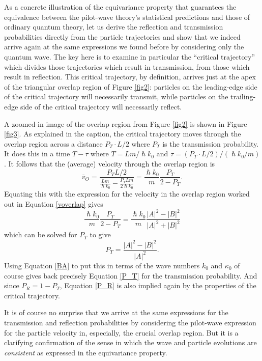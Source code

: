 \documentclass[aps,prc,onecolumn,letterpaper,floatfix,12pt]{revtex4}
\renewcommand{\hbar}{\hslash}
\begin{document}
As a concrete illustration of the equivariance property that guarantees
the equivalence between the pilot-wave theory's statistical
predictions and those of ordinary quantum theory, let us derive the
reflection and transmission probabilities directly from the particle
trajectories and show that we indeed arrive again at the same
expressions we found before by considering only the quantum wave.  The
key here is to examine in particular the ``critical trajectory'' which
divides those trajectories which result in transmission, from those
which result in reflection.  This critical trajectory, by definition,
arrives just at the apex of the triangular overlap region of Figure
\ref{fig2}:  particles on the leading-edge side of the critical
trajectory will necessarily transmit, while particles on the
trailing-edge side of the critical trajectory will necessarily
reflect.  



A zoomed-in image of the overlap region from Figure \ref{fig2} is
shown in Figure \ref{fig3}.   As explained in the caption, the
critical trajectory moves through the overlap region across a distance 
$P_T\cdot L / 2$ where $P_T$ is the transmission probability.  It does
this in a time $T - \tau$ where $T = L m / \hbar k_0 $ and $\tau = (P_T
\cdot L / 2)/(\hbar k_0 /m)$.  It follows that the (average) velocity
through the overlap region is
\begin{equation}
\bar{v}_O = \frac{ P_T L / 2}{\frac{Lm}{\hbar k_0} - \frac{P_T L m}{2 \hbar
    k_0}} = \frac{\hbar k_0}{m} \frac{P_T}{2-P_T}.
\label{vOtraj}
\end{equation}
Equating this with the expression for the velocity in the overlap
region worked out in Equation \eqref{voverlap} gives
\begin{equation}
\frac{\hbar k_0}{m} \frac{P_T}{2-P_T} = \frac{\hbar k_0}{m} \frac{|A|^2 -
  |B|^2}{|A|^2 + |B|^2}
\end{equation}
which can be solved for $P_T$ to give
\begin{equation}
P_T = \frac{|A|^2 - |B|^2}{|A|^2}.
\end{equation}
Using Equation \eqref{BA} to put this in terms of the wave numbers
$k_0$ and $\kappa_0$ of course gives back precisely Equation \eqref{P_T} for the
transmission probability.  And since $P_R = 1-P_T$, 
Equation \eqref{P_R} is also implied again by the properties of the
critical trajectory.  

It is of course no surprise that we arrive at the same expressions for
the transmission and reflection probabilities by considering the
pilot-wave expression for the particle velocity in, especially, the
crucial overlap region.  But it is a clarifying confirmation of the
sense in which the wave and particle evolutions are \emph{consistent}
as expressed in the equivariance property.
\end{document}

